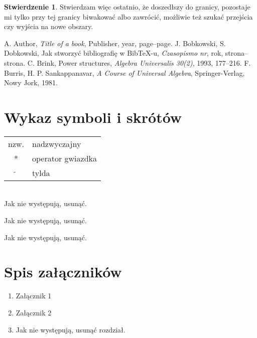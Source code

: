 \documentclass[a4paper,11pt,twoside]{report}
\theoremstyle{definition}
\newtheorem{proposition}[theorem]{Stwierdzenie}
\begin{document}
\begin{proposition}
  Stwierdzam więc ostatnio, że doszedłszy do granicy, pozostaje mi tylko przy tej granicy biwakować albo zawrócić, możliwie też szukać przejścia czy wyjścia na nowe obszary.
\end{proposition}



\begin{thebibliography}{20}%

   A. Author, \emph{Title of a book}, Publisher, year, page--page.
   J. Bobkowski, S. Dobkowski, Jak stworzyć bibliografię w BibTeX-u, \emph{Czasopismo nr}, rok, strona--strona.
   C. Brink, Power structures, \emph{Algebra Universalis 30(2)}, 1993, 177--216.
   F. Burris, H. P. Sankappanavar, \emph{A Course of Universal Algebra}, Springer-Verlag, Nowy Jork, 1981.
\end{thebibliography}

\thispagestyle{empty}



\chapter*{Wykaz symboli i skrótów}

\begin{tabular}{cl}
  nzw.           & nadzwyczajny      \\
  *              & operator gwiazdka \\
  $\widetilde{}$ & tylda
\end{tabular}
\\
Jak nie występują, usunąć.
\thispagestyle{empty}


\listoffigures
\thispagestyle{empty}
Jak nie występują, usunąć.


\renewcommand{\listtablename}{Spis tabel}
\listoftables
\thispagestyle{empty}
Jak nie występują, usunąć.



\chapter*{Spis załączników}
\begin{enumerate}
  \item Załącznik 1
  \item Załącznik 2
  \item Jak nie występują, usunąć rozdział.
\end{enumerate}
\thispagestyle{empty}
\end{document}
